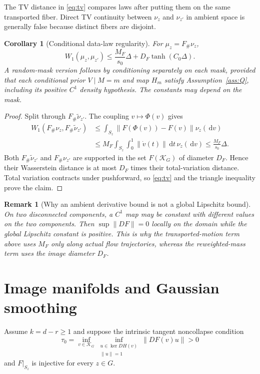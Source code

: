 \documentclass[11pt]{article}
\newtheorem{corollary}[theorem]{Corollary}
\newtheorem{remark}[theorem]{Remark}
\theoremstyle{definition}
\newcommand{\dd}{\,\mathrm d}
\begin{document}
The TV distance in \eqref{eq:tv} compares laws after putting them on the same
transported fiber.  Direct TV continuity between $\nu_z$ and $\nu_{z'}$ in
ambient space is generally false because distinct fibers are disjoint.

\begin{corollary}[Conditional data-law regularity]\label{cor:data-law}
For $\mu_z=F_\#\nu_z$,
\[
 W_1(\mu_z,\mu_{z'})
 \le \frac{M_F}{s_0}\Delta
 +D_F\tanh(C_0\Delta).
\]
A random-mask version follows by conditioning separately on each mask,
provided that each conditional prior $V\mid M=m$ and map $H_m$ satisfy
Assumption~\ref{ass:Q}, including its positive $C^1$ density hypothesis.
The constants may depend on the mask.
\end{corollary}

\begin{proof}
Split through $F_\#\widetilde\nu_{z'}$.  The coupling
$v\mapsto\Phi(v)$ gives
\[
 \begin{aligned}
 W_1(F_\#\nu_z,F_\#\widetilde\nu_{z'})
 &\le \int_{S_z}\|F(\Phi(v))-F(v)\|\nu_z(\dd v)\\
 &\le M_F\int_{S_z}\int_0^1\|\dot v(t)\|\dd t\,\nu_z(\dd v)
 \le \frac{M_F}{s_0}\Delta.
 \end{aligned}
\]
Both $F_\#\widetilde\nu_{z'}$ and $F_\#\nu_{z'}$ are supported in the set
$F(\mathcal K_G)$ of diameter $D_F$.  Hence their Wasserstein distance is at
most $D_F$ times their total-variation distance.  Total variation contracts
under pushforward, so \eqref{eq:tv} and the triangle inequality prove the
claim.
\end{proof}

\begin{remark}[Why an ambient derivative bound is not a global Lipschitz bound]
On two disconnected components, a $C^1$ map may be constant with different
values on the two components.  Then $\sup\|DF\|=0$ locally on the domain while
the global Lipschitz constant is positive.  This is why the transported-motion
term above uses $M_F$ only along actual flow trajectories, whereas the
reweighted-mass term uses the image diameter $D_F$.
\end{remark}

\section{Image manifolds and Gaussian smoothing}

Assume $k=d-r\ge1$ and suppose the intrinsic tangent noncollapse condition
\begin{equation}\label{eq:noncollapse}
 \tau_0=\inf_{v\in\mathcal K_G}
 \inf_{\substack{u\in\ker DH(v)\\\|u\|=1}}\|DF(v)u\|>0
\end{equation}
and $F|_{S_z}$ is injective for every $z\in G$.
\end{document}
